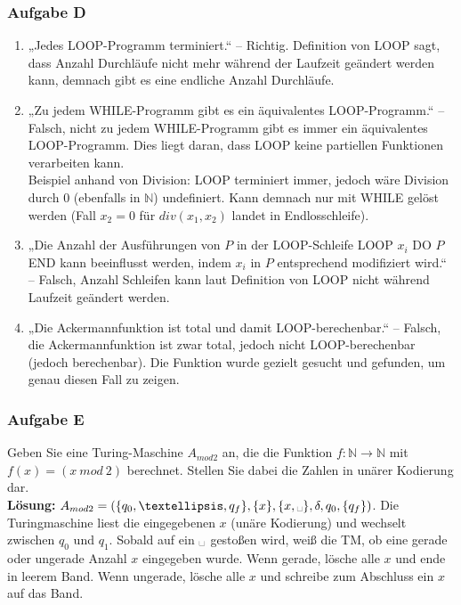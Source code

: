 \documentclass[a4paper,10pt]{article}
\newcommand{\blank}{\text{\textvisiblespace}}
\begin{document}
    \subsubsection*{Aufgabe D}
        \begin{enumerate}
            \item „Jedes LOOP-Programm terminiert.“ – Richtig. Definition von LOOP sagt, dass Anzahl Durchläufe nicht mehr während der Laufzeit geändert werden kann, demnach gibt es eine endliche Anzahl Durchläufe.

            \item „Zu jedem WHILE-Programm gibt es ein äquivalentes LOOP-Programm.“ – Falsch, nicht zu jedem WHILE-Programm gibt es immer ein äquivalentes LOOP-Programm. Dies liegt daran, dass LOOP keine partiellen Funktionen verarbeiten kann. \\
            Beispiel anhand von Division: LOOP terminiert immer, jedoch wäre Division durch $0$ (ebenfalls in $\mathbb{N}$) undefiniert. Kann demnach nur mit WHILE gelöst werden (Fall $x_2 = 0$ für $div(x_1, x_2)$ landet in Endlosschleife).

            \item „Die Anzahl der Ausführungen von $P$ in der LOOP-Schleife LOOP $x_i$ DO $P$ END kann beeinflusst werden, indem $x_i$ in $P$ entsprechend modifiziert wird.“ – Falsch, Anzahl Schleifen kann laut Definition von LOOP nicht während Laufzeit geändert werden.

            \item „Die Ackermannfunktion ist total und damit LOOP-berechenbar.“ – Falsch, die Ackermannfunktion ist zwar total, jedoch nicht LOOP-berechenbar (jedoch berechenbar). Die Funktion wurde gezielt gesucht und gefunden, um genau diesen Fall zu zeigen.
        \end{enumerate}

    \subsubsection*{Aufgabe E}
        Geben Sie eine Turing-Maschine $A_{mod2}$ an, die die Funktion  $f: \mathbb{N} \to \mathbb{N}$ mit $f(x) = (x~mod~ 2)$ berechnet. Stellen Sie dabei die Zahlen in unärer Kodierung dar. \\
        \textbf{Lösung:} $A_{mod2} = (\{q_0,…,q_f\}, \{x\}, \{x, \blank\}, \delta, q_0, \{q_f\})$. Die Turingmaschine liest die eingegebenen $x$ (unäre Kodierung) und wechselt zwischen $q_0$ und $q_1$. Sobald auf ein $\blank$ gestoßen wird, weiß die TM, ob eine gerade oder ungerade Anzahl $x$ eingegeben wurde. Wenn gerade, lösche alle $x$ und ende in leerem Band. Wenn ungerade, lösche alle $x$ und schreibe zum Abschluss ein $x$ auf das Band.
\end{document}
